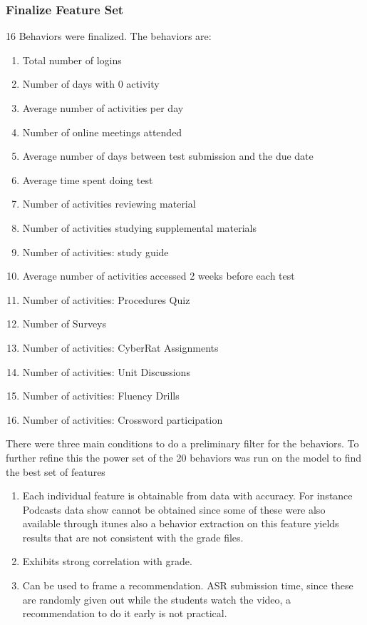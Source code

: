 \documentclass[12pt]{article}
\begin{document}
	\subsubsection{Finalize Feature Set}
	16 Behaviors were finalized. The behaviors are:
	\begin{enumerate}
		\item Total number of logins
		\item Number of days with 0 activity
		\item Average number of activities per day
		\item Number of online meetings attended
		\item Average number of days between test submission and the due date
		\item Average time spent doing test
		\item Number of activities reviewing material
		\item Number of activities studying supplemental materials
		\item Number of activities: study guide
		\item Average number of activities accessed 2 weeks before each test
		\item Number of activities: Procedures Quiz
		\item Number of Surveys	
		\item Number of activities: CyberRat Assignments	
		\item Number of activities: Unit Discussions
		\item Number of activities: Fluency Drills
		\item Number of activities: Crossword participation
	\end{enumerate}
	There were three main conditions to do a preliminary filter for the behaviors. To further refine this the power set of the 20 behaviors was run on the model to find the best set of features
	\begin{enumerate}
		\item Each individual feature is obtainable from data with accuracy. For instance Podcasts data show cannot be obtained since some of these were also available through itunes also a behavior extraction on this feature yields results that are not consistent with the grade files.
		\item Exhibits strong correlation with grade.
		\item Can be used to frame a recommendation. ASR submission time, since these are randomly given out while the students watch the video, a recommendation to do it early is not practical.
	\end{enumerate}
\end{document}
